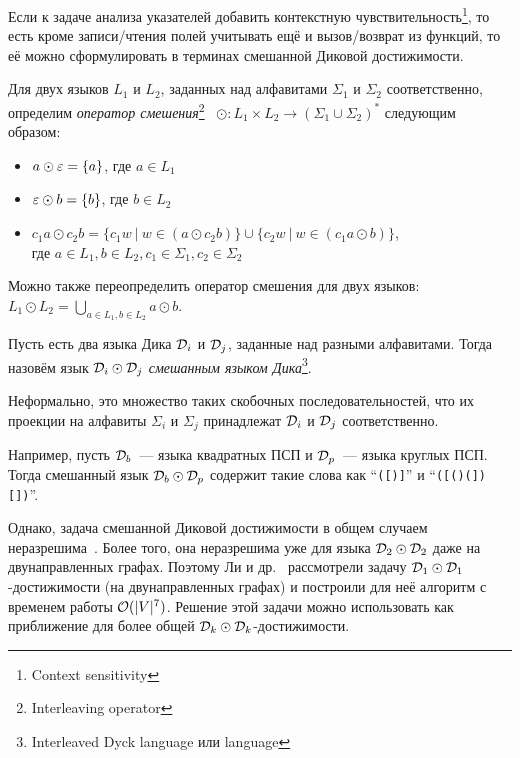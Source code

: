 Если к задаче анализа указателей добавить контекстную чувствительность\footnote{Context sensitivity}, то есть кроме записи/чтения полей учитывать ещё и вызов/возврат из функций, то её можно сформулировать в терминах смешанной Диковой достижимости.

\pagebreak

\begin{definition}
  Для двух языков $L_1$ и $L_2$, заданных над алфавитами $\Sigma_1$ и $\Sigma_2$ соответственно, определим \textit{оператор смешения}\footnote{Interleaving operator}~\cite{Li21} $\odot: L_1 \times L_2 \to (\Sigma_1 \cup \Sigma_2)^{*}$ следующим образом:
  \vspace{-\topsep}
  \begin{itemize}
    \setlength\itemsep{-0.1em}
    \item $a \odot \varepsilon = \{ a \}$, где $a \in L_1$
    \item $\varepsilon \odot b = \{ b \}$, где $b \in L_2$
    \item $c_1 a \odot c_2 b = \{ c_1 w~|~w \in (a \odot c_2 b) \} \cup \{ c_2 w~|~w \in (c_1 a \odot b) \}$,\\ где $a \in L_1, b \in L_2, c_1 \in \Sigma_1, c_2 \in \Sigma_2$
  \end{itemize}

  Можно также переопределить оператор смешения для двух языков:\\ $L_1 \odot L_2 = \bigcup\limits_{a \in L_1, b \in L_2} a \odot b$.
\end{definition}

\begin{definition}
  Пусть есть два языка Дика $\mathcal{D}_i$ и $\mathcal{D}_j$, заданные над разными алфавитами. Тогда назовём язык $\mathcal{D}_i \odot \mathcal{D}_j$ \textit{смешанным языком Дика}\footnote{Interleaved Dyck language или  language}.

  Неформально, это множество таких скобочных последовательностей, что их проекции на алфавиты $\Sigma_i$ и $\Sigma_j$ принадлежат $\mathcal{D}_i$ и $\mathcal{D}_j$ соответственно.

  Например, пусть $\mathcal{D}_b$~--- языка квадратных ПСП и $\mathcal{D}_p$~--- языка круглых ПСП. Тогда смешанный язык $\mathcal{D}_b \odot \mathcal{D}_p$ содержит такие слова как ``\texttt{([)]}'' и ``\texttt{([()(])[])}''.
\end{definition}

Однако, задача смешанной Диковой достижимости в общем случаем неразрешима~\cite{Reps00}. Более того, она неразрешима уже для языка $\mathcal{D}_2 \odot \mathcal{D}_2$ даже на двунаправленных графах. Поэтому Ли и др.~\cite{Li21} рассмотрели задачу $\mathcal{D}_1 \odot \mathcal{D}_1$-достижимости (на двунаправленных графах) и построили для неё алгоритм с временем работы $\mathcal{O}(|V|^7)$. Решение этой задачи можно использовать как приближение для более общей $\mathcal{D}_k \odot \mathcal{D}_k$-достижимости.

